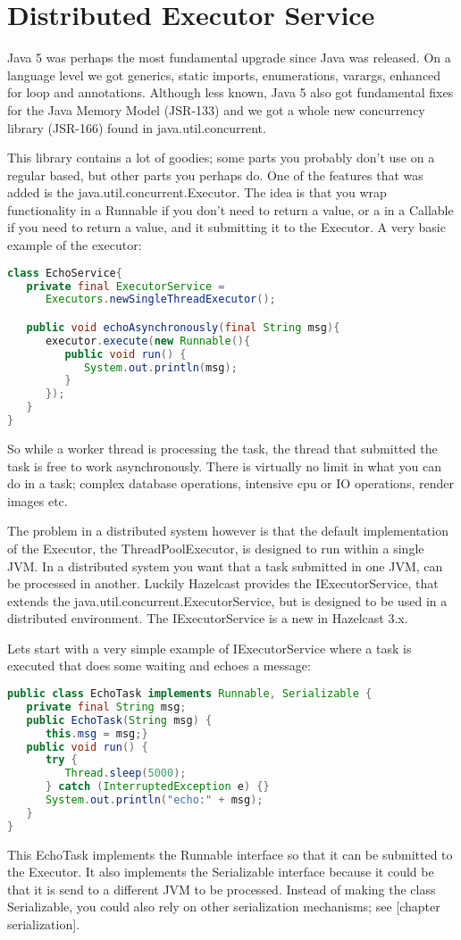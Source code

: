 \chapter{Distributed Executor Service}
Java 5 was perhaps the most fundamental upgrade since Java was released. On a language level we got generics, static imports, enumerations, varargs, enhanced for loop and annotations. Although less known, Java 5 also got fundamental fixes for the Java Memory Model (JSR-133) and we got a whole new concurrency library (JSR-166) found in java.util.concurrent.

This library contains a lot of goodies; some parts you probably don't use on a regular based, but other parts you perhaps do. One of the features that was added is the java.util.concurrent.Executor. The idea is that you wrap functionality in a Runnable if you don't need to return a value, or a in a Callable if you need to return a value, and it submitting it to the Executor. A very basic example of the executor:
\begin{lstlisting}[language=java]
class EchoService{
   private final ExecutorService = 
      Executors.newSingleThreadExecutor();

   public void echoAsynchronously(final String msg){
      executor.execute(new Runnable(){
         public void run() { 
            System.out.println(msg); 
         }
      });	
   }
}
\end{lstlisting}
So while a worker thread is processing the task, the thread that submitted the task is free to work asynchronously. There is virtually no limit in what you can do in a task; complex database operations, intensive cpu or IO operations, render images etc. 

The problem in a distributed system however is that the default implementation of the Executor, the ThreadPoolExecutor, is designed to run within a single JVM. In a distributed system you want that a task submitted in one JVM, can be processed in another. Luckily Hazelcast provides the IExecutorService, that extends the java.util.concurrent.ExecutorService, but is designed to be used in a distributed environment. The IExecutorService is a new in Hazelcast 3.x.

Lets start with a very simple example of IExecutorService where a task is executed that does some waiting and echoes a message:
\begin{lstlisting}[language=java]
public class EchoTask implements Runnable, Serializable {
   private final String msg;
   public EchoTask(String msg) {
      this.msg = msg;}
   public void run() {
      try { 
         Thread.sleep(5000);
      } catch (InterruptedException e) {}
      System.out.println("echo:" + msg);
   }
}
\end{lstlisting}
This EchoTask implements the Runnable interface so that it can be submitted to the Executor. It also implements the Serializable interface because it could be that it is send to a different JVM to be processed. Instead of making the class Serializable, you could also rely on other serialization mechanisms; see [chapter serialization]. 

